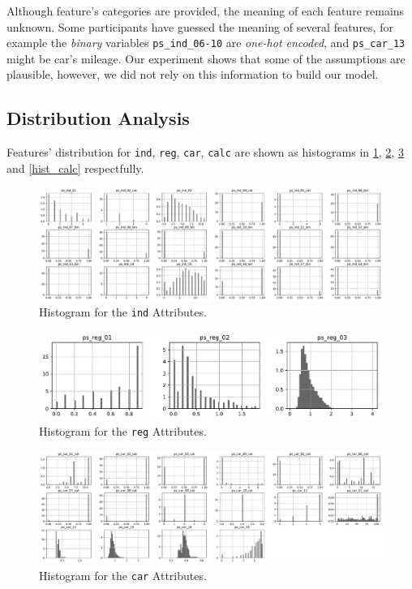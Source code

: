 \documentclass{standalone}
\begin{document}
Although feature's categories are provided, the meaning of each feature remains unknown. Some participants have guessed the meaning of several features, for example the \emph{binary} variables  \lstinline{ps_ind_06-10} are \emph{one-hot encoded}, and \lstinline{ps_car_13} might be car's mileage.
Our experiment shows that some of the assumptions are plausible, however, we did not rely on this information to build our model.

\subsection{Distribution Analysis}

Features' distribution for \lstinline{ind}, \lstinline{reg}, \lstinline{car}, \lstinline{calc} are shown as histograms in \cref{hist_ind}, \cref{hist_reg}, \cref{hist_car} and \cref{hist_calc} respectfully.

\begin{figure}[!htb]
\centering
\includegraphics[width=\textwidth]{fig/ind_col.pdf}
\caption{Histogram for the \lstinline{ind} Attributes.}
\label{hist_ind}
\end{figure}

\begin{figure}[!ht]
\centering
\includegraphics[width=.5\textwidth]{fig/reg_col.pdf}
\caption{Histogram for the \lstinline{reg} Attributes.}
\label{hist_reg}
\end{figure}

\begin{figure}[!ht]
\centering
\includegraphics[width=\textwidth]{fig/car_col.pdf}
\caption{Histogram for the \lstinline{car} Attributes.}
\label{hist_car}
\end{figure}
\end{document}
